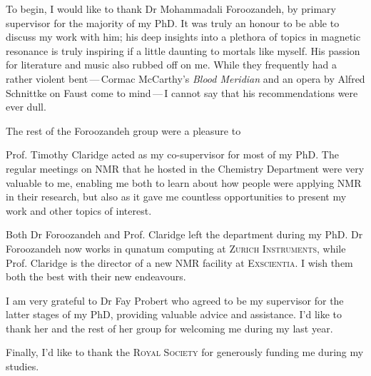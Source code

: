 \begin{acknowledgements}
    To begin, I would like to thank Dr Mohammadali Foroozandeh, by primary
    supervisor for the majority of my PhD. It was truly an honour to be able to
    discuss my work with him; his deep insights into a plethora of
    topics in magnetic resonance is truly inspiring if a little daunting to
    mortals like myself. His passion for literature and music also rubbed off
    on me. While they frequently had a rather violent
    bent\,---\,Cormac McCarthy's \emph{Blood Meridian} and an opera by Alfred
    Schnittke on Faust come to mind\,---\,I cannot say that his recommendations
    were ever dull.

    The rest of the Foroozandeh group were a pleasure to

    Prof. Timothy Claridge acted as my co-supervisor for most of my PhD. The
    regular meetings on NMR that he hosted in the Chemistry Department were
    very valuable to me, enabling me both to learn about how people were
    applying NMR in their research, but also as it gave me countless
    opportunities to present my work and other topics of interest.

    Both Dr Foroozandeh and Prof. Claridge left the department during my PhD.
    Dr Foroozandeh now works in qunatum computing at \textsc{Zurich
    Instruments}, while Prof. Claridge is the director of a new NMR facility at
    \textsc{Exscientia}. I wish them both the best with their new endeavours.

    I am very grateful to Dr Fay Probert who agreed to be my supervisor for
    the latter stages of my PhD, providing valuable advice and assistance. I'd
    like to thank her and the rest of her group for welcoming me during my last
    year.

    Finally, I'd like to thank the \textsc{Royal Society} for generously
    funding me during my studies.
\end{acknowledgements}
